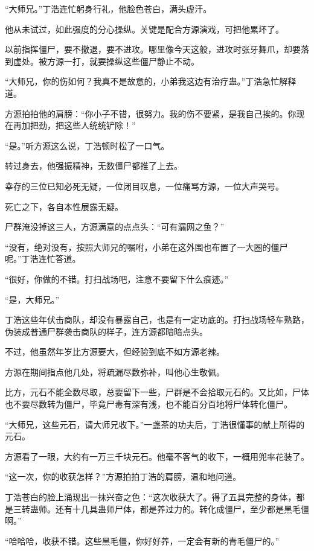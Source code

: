\begin{this_body}
“大师兄。”丁浩连忙躬身行礼，他脸色苍白，满头虚汗。

他从未试过，如此强度的分心操纵。关键是配合方源演戏，可把他累坏了。

以前指挥僵尸，要不撤退，要不进攻。哪里像今天这般，进攻时张牙舞爪，却要落到虚处。被方源一打，就要操纵这些僵尸静止不动。

“大师兄，你的伤如何？我真不是故意的，小弟我这边有治疗蛊。”丁浩急忙解释道。

方源拍拍他的肩膀：“你小子不错，很努力。我的伤不要紧，是我自己挨的。你现在再加把劲，把这些人统统铲除！”

“是。”听方源这么说，丁浩顿时松了一口气。

转过身去，他强振精神，无数僵尸都推了上去。

幸存的三位已知必死无疑，一位闭目叹息，一位痛骂方源，一位大声哭号。

死亡之下，各自本性展露无疑。

尸群淹没掉这三人，方源满意的点点头：“可有漏网之鱼？”

“没有，绝对没有，按照大师兄的嘱咐，小弟在这外围也布置了一大圈的僵尸呢。”丁浩连忙答道。

“很好，你做的不错。打扫战场吧，注意不要留下什么痕迹。”

“是，大师兄。”

丁浩这些年伏击商队，却没有暴露自己，也是有一定功底的。打扫战场轻车熟路，伪装成普通尸群袭击商队的样子，连方源都暗暗点头。

不过，他虽然年岁比方源要大，但经验到底不如方源老辣。

方源在期间指点他几处，将疏漏尽数弥补，叫他心生敬佩。

比方，元石不能全数尽取，总要留下一些，尸群是不会拾取元石的。又比如，尸体也不要尽数转为僵尸，毕竟尸毒有深有浅，也不能百分百地将尸体转化僵尸。

“大师兄，这些元石，请大师兄收下。”一盏茶的功夫后，丁浩很懂事的献上所得的元石。

方源看了一眼，大约有一万三千块元石。他毫不客气的收下，一概用兜率花装了。

“这一次，你的收获怎样？”方源拍拍丁浩的肩膀，温和地问道。

丁浩苍白的脸上涌现出一抹兴奋之色：“这次收获大了。得了五具完整的身体，都是三转蛊师。还有十几具蛊师尸体，都是养过力的。转化成僵尸，至少都是黑毛僵啊。”

“哈哈哈，收获不错。这些黑毛僵，你好好养，一定会有新的青毛僵尸的。”


\end{this_body}
